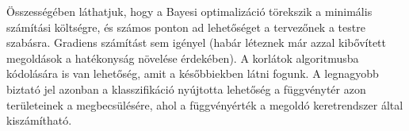 Összességében láthatjuk, hogy a Bayesi optimalizáció törekszik a minimális számítási költségre, és számos ponton ad lehetőséget a tervezőnek a testre szabásra. Gradiens számítást sem igényel (habár léteznek már azzal kibővített megoldások a hatékonyság növelése érdekében). 
A korlátok algoritmusba kódolására is van lehetőség, amit a későbbiekben látni fogunk. 
A legnagyobb biztató jel azonban a klasszifikáció nyújtotta lehetőség a függvénytér azon területeinek a megbecsülésére, ahol a függvényérték a megoldó keretrendszer által kiszámítható.

